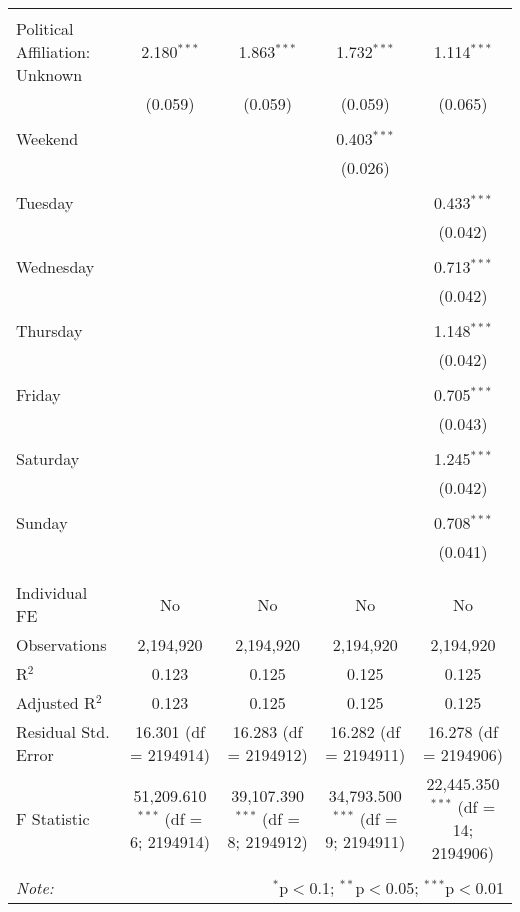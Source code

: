 \documentclass[
]{article}
\begin{document}
\begin{table}[!htbp]
{\begin{tabular}{@{\extracolsep{5pt}}lcccc}
  & & & & \\ 
 Political Affiliation: Unknown & 2.180$^{***}$ & 1.863$^{***}$ & 1.732$^{***}$ & 1.114$^{***}$ \\ 
  & (0.059) & (0.059) & (0.059) & (0.065) \\ 
  & & & & \\ 
 Weekend &  &  & 0.403$^{***}$ &  \\ 
  &  &  & (0.026) &  \\ 
  & & & & \\ 
 Tuesday &  &  &  & 0.433$^{***}$ \\ 
  &  &  &  & (0.042) \\ 
  & & & & \\ 
 Wednesday &  &  &  & 0.713$^{***}$ \\ 
  &  &  &  & (0.042) \\ 
  & & & & \\ 
 Thursday &  &  &  & 1.148$^{***}$ \\ 
  &  &  &  & (0.042) \\ 
  & & & & \\ 
 Friday &  &  &  & 0.705$^{***}$ \\ 
  &  &  &  & (0.043) \\ 
  & & & & \\ 
 Saturday &  &  &  & 1.245$^{***}$ \\ 
  &  &  &  & (0.042) \\ 
  & & & & \\ 
 Sunday &  &  &  & 0.708$^{***}$ \\ 
  &  &  &  & (0.041) \\ 
  & & & & \\ 
\hline \\[-1.8ex] 
Individual FE & No & No & No & No \\ 
Observations & 2,194,920 & 2,194,920 & 2,194,920 & 2,194,920 \\ 
R$^{2}$ & 0.123 & 0.125 & 0.125 & 0.125 \\ 
Adjusted R$^{2}$ & 0.123 & 0.125 & 0.125 & 0.125 \\ 
Residual Std. Error & 16.301 (df = 2194914) & 16.283 (df = 2194912) & 16.282 (df = 2194911) & 16.278 (df = 2194906) \\ 
F Statistic & 51,209.610$^{***}$ (df = 6; 2194914) & 39,107.390$^{***}$ (df = 8; 2194912) & 34,793.500$^{***}$ (df = 9; 2194911) & 22,445.350$^{***}$ (df = 14; 2194906) \\ 
\hline 
\hline \\[-1.8ex] 
\textit{Note:}  & \multicolumn{4}{r}{$^{*}$p$<$0.1; $^{**}$p$<$0.05; $^{***}$p$<$0.01} \\ 
\end{tabular}
} 
\end{table} 
\newpage
\end{document}
